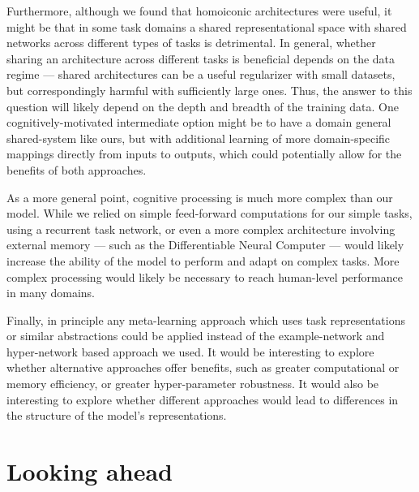Furthermore, although we found that homoiconic architectures were useful, it might be that in some task domains a shared representational space with shared networks across different types of tasks is detrimental. In general, whether sharing an architecture across different tasks is beneficial depends on the data regime --- shared architectures can be a useful regularizer with small datasets, but correspondingly harmful with sufficiently large ones. Thus, the answer to this question will likely depend on the depth and breadth of the training data. One cognitively-motivated intermediate option might be to have a domain general shared-system like ours, but with additional learning of more domain-specific mappings directly from inputs to outputs, which could potentially allow for the benefits of both approaches.\par

As a more general point, cognitive processing is much more complex than our model. While we relied on simple feed-forward computations for our simple tasks, using a recurrent task network, or even a more complex architecture involving external memory --- such as the Differentiable Neural Computer \citep{Graves2016} --- would likely increase the ability of the model to perform and adapt on complex tasks. More complex processing would likely be necessary to reach human-level performance in many domains.\par 

Finally, in principle any meta-learning approach which uses task representations or similar abstractions \citep[e.g.][]{Rusu2019, Zintgraf2018} could be applied instead of the example-network and hyper-network based approach we used. It would be interesting to explore whether alternative approaches offer benefits, such as greater computational or memory efficiency, or greater hyper-parameter robustness. It would also be interesting to explore whether different approaches would lead to differences in the structure of the model's representations. \par 


\section{Looking ahead}

